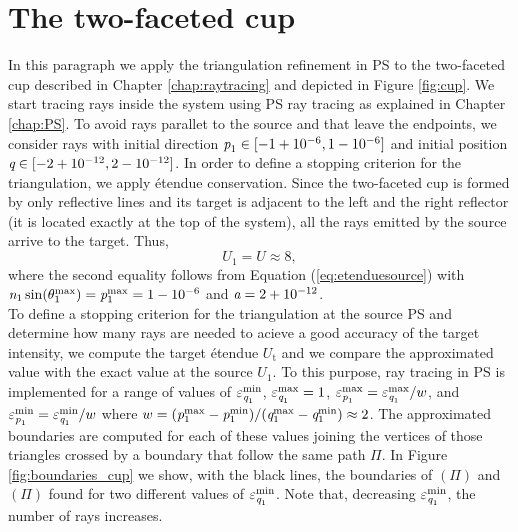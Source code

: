 \section{The two-faceted cup}
In this paragraph we apply the triangulation refinement in PS to the two-faceted cup described in Chapter \ref{chap:raytracing} and depicted in Figure \ref{fig:cup}. 
We start tracing rays inside the system using PS ray tracing as explained in Chapter \ref{chap:PS}. To avoid rays parallet to the source and that leave the endpoints, we consider rays with initial direction $\textit{p}_1\in[-1+10^{-6},1-10^{-6}]$ and initial position $\textit{q}\in[-2+10^{-12}, 2-10^{-12}]$. In order to define a stopping criterion for the triangulation, we apply \'{e}tendue conservation. Since the two-faceted cup is formed by only reflective lines and its target is adjacent to the left and the right reflector (it is located exactly at the top of the system),  all the rays emitted by the source arrive to the target. Thus, 
\begin{equation}U_1 = U\approx 8, \end{equation}
where the second equality follows from Equation (\ref{eq:etenduesource}) with $\textit{n}_1\sin(\theta_1^{\textrm{max}})=\textit{p}_1^\textrm{max}=1-10^{-6}$ and $\textit{a}=2+10^{-12}$.\\
To define a stopping criterion for the triangulation at the source PS and determine how many rays are needed to acieve a good accuracy of the target intensity, we compute the target \'{e}tendue $U_{\textrm{t}}$ and we compare the approximated value with the exact value at the source $U_1$. 
To this purpose, ray tracing in PS is implemented for a range of values of $\varepsilon_{\textit{q}_1}^{\textrm{min}}$, $\varepsilon_{\textit{q}_1}^{\textrm{max}}=1$, $\varepsilon_{\textit{p}_1}^{\textrm{max}} = \varepsilon_{\textit{q}_1}^{\textrm{max}}/w$, and $\varepsilon_{\textit{p}_1}^{\textrm{min}}= \varepsilon_{\textit{q}_1}^{\textrm{min}}/w$ where $w = (\textit{p}_1^{\textrm{max}}-\textit{p}_1^{\textrm{min}})/(\textit{q}_1^{\textrm{max}}-\textit{q}_1^{\textrm{min}})\approx2$. 
The approximated boundaries are computed for each of these values joining the vertices of those triangles crossed by a boundary that follow the same path $\Pi$. 
In Figure \ref{fig:boundaries_cup} we show, with the black lines, the boundaries of $(\Pi)$ and $(\Pi)$ found for two different values of $\varepsilon_{\textit{q}_1}^{\textrm{min}}$. Note that, decreasing $\varepsilon_{\textit{q}_1}^{\textrm{min}}$, the number of rays increases. 
